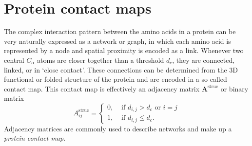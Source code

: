 \documentclass[
reprint,
twocolumn,
amsmath,amssymb,superscriptaddress,aps,
pre]{revtex4-1}
\begin{document}
\section{Protein contact maps}
The complex interaction pattern between the amino acids in a protein can be very naturally expressed as a network or graph, in which each amino acid is represented by a node and spatial proximity is encoded as a link. Whenever two central $C_\alpha$ atoms are closer together than a threshold $d_c$, they are connected, linked, or in `close contact'. These connections can be determined from the 3D functional or folded structure of the protein and are encoded in a so called contact map. This contact map is effectively an adjacency matrix $\textbf{A}^{\mathrm{struc}}$ or binary matrix
\begin{equation}
  A^{\mathrm{struc}}_{ij}=
  \begin{cases}
   0, & \text{ if } d_{i,j}>d_c \text{ or } i=j\\
      1, & \text{ if } d_{i,j}\leq d_c .
      \end{cases}
    \label{eq:aij}
\end{equation}
Adjacency matrices are commonly used to describe networks and make up a \textit{protein contact map}. 
\end{document}

